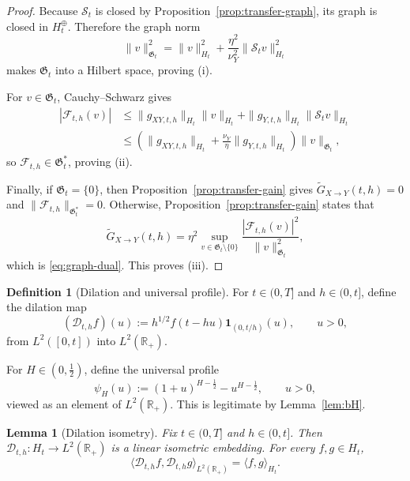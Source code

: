 \documentclass[11pt,a4paper]{amsart}
\theoremstyle{plain}
\newtheorem{lemma}[theorem]{Lemma}
\theoremstyle{definition}
\newtheorem{definition}[theorem]{Definition}
\theoremstyle{remark}
\newcommand{\R}{\mathbb{R}}
\newcommand{\one}{\mathbf 1}
\begin{document}
\begin{proof}
Because $\mathcal S_t$ is closed by Proposition~\ref{prop:transfer-graph}, its graph is
closed in $H_t^\oplus$. Therefore the graph norm
\[
\|v\|_{\mathfrak G_t}^2
=
\|v\|_{H_t}^2+\frac{\eta^2}{\nu_Y^2}\|\mathcal S_t v\|_{H_t}^2
\]
makes $\mathfrak G_t$ into a Hilbert space, proving (i).

For $v\in\mathfrak G_t$, Cauchy--Schwarz gives
\begin{align*}
|\mathcal F_{t,h}(v)|
&\le
\|g_{XY,t,h}\|_{H_t}\|v\|_{H_t}
+\|g_{Y,t,h}\|_{H_t}\|\mathcal S_t v\|_{H_t} \\
&\le
\left(
\|g_{XY,t,h}\|_{H_t}
+\frac{\nu_Y}{\eta}\|g_{Y,t,h}\|_{H_t}
\right)\|v\|_{\mathfrak G_t},
\end{align*}
so $\mathcal F_{t,h}\in\mathfrak G_t^*$, proving (ii).

Finally, if $\mathfrak G_t=\{0\}$, then Proposition~\ref{prop:transfer-gain} gives
$\widetilde G_{X\to Y}(t,h)=0$ and $\|\mathcal F_{t,h}\|_{\mathfrak G_t^*}=0$. Otherwise,
Proposition~\ref{prop:transfer-gain} states that
\[
\widetilde G_{X\to Y}(t,h)
=
\eta^2
\sup_{v\in\mathfrak G_t\setminus\{0\}}
\frac{|\mathcal F_{t,h}(v)|^2}{\|v\|_{\mathfrak G_t}^2},
\]
which is \eqref{eq:graph-dual}. This proves (iii).
\end{proof}

\begin{definition}[Dilation and universal profile]\label{def:dilation}
For $t\in(0,T]$ and $h\in(0,t]$, define the dilation map
\begin{equation}\label{eq:dilation}
(\mathcal D_{t,h}f)(u):=h^{1/2}f(t-hu)\one_{(0,t/h)}(u),
\qquad
u>0,
\end{equation}
from $L^2([0,t])$ into $L^2(\R_+)$.

For $H\in(0,\tfrac12)$, define the universal profile
\begin{equation}\label{eq:psiH}
\psi_H(u):=(1+u)^{H-\frac12}-u^{H-\frac12},
\qquad u>0,
\end{equation}
viewed as an element of $L^2(\R_+)$. This is legitimate by Lemma~\ref{lem:bH}.
\end{definition}

\begin{lemma}[Dilation isometry]\label{lem:dilation-isometry}
Fix $t\in(0,T]$ and $h\in(0,t]$. Then $\mathcal D_{t,h}:H_t\to L^2(\R_+)$ is a linear
isometric embedding. For every $f,g\in H_t$,
\begin{equation}\label{eq:dilation-isometry}
\langle \mathcal D_{t,h}f,\mathcal D_{t,h}g\rangle_{L^2(\R_+)}
=
\langle f,g\rangle_{H_t}.
\end{equation}
\end{lemma}
\end{document}
